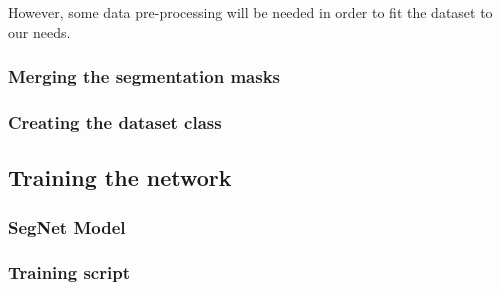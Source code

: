 However, some data pre-processing will be needed in order to fit the dataset to our needs.

\subsubsection{Merging the segmentation masks}

\subsubsection{Creating the dataset class} 

\subsection{Training the network}
\label{sec:training}

\subsubsection{SegNet Model}

\subsubsection{Training script}
